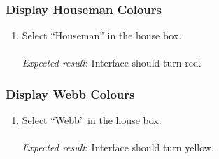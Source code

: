 \subsubsection{Display Houseman Colours} %
\label{ssub:display_houseman_colours}
\begin{enumerate}[leftmargin=*]
\item Select ``Houseman'' in the house box.\\\\
\textit{Expected result}: Interface should turn red.
\end{enumerate}

\subsubsection{Display Webb Colours} %
\label{ssub:display_webb_colours}
\begin{enumerate}[leftmargin=*]
\item Select ``Webb'' in the house box.\\\\
\textit{Expected result}: Interface should turn yellow.
\end{enumerate}
